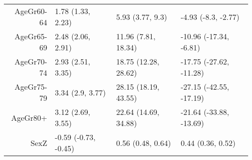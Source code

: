 \begin{table}[ht]
\begin{tabular}{rlll}
  AgeGr60-64 & 1.78 (1.33, 2.23) & 5.93 (3.77, 9.3) & -4.93 (-8.3, -2.77) \\ 
  AgeGr65-69 & 2.48 (2.06, 2.91) & 11.96 (7.81, 18.34) & -10.96 (-17.34, -6.81) \\ 
  AgeGr70-74 & 2.93 (2.51, 3.35) & 18.75 (12.28, 28.62) & -17.75 (-27.62, -11.28) \\ 
  AgeGr75-79 & 3.34 (2.9, 3.77) & 28.15 (18.19, 43.55) & -27.15 (-42.55, -17.19) \\ 
  AgeGr80+ & 3.12 (2.69, 3.55) & 22.64 (14.69, 34.88) & -21.64 (-33.88, -13.69) \\ 
  SexZ & -0.59 (-0.73, -0.45) & 0.56 (0.48, 0.64) & 0.44 (0.36, 0.52) \\ 
   \hline
\end{tabular}
\end{table}
